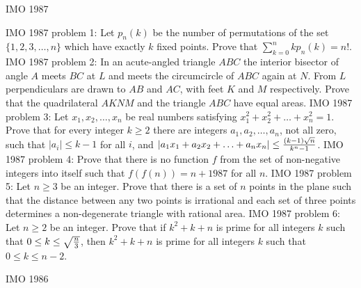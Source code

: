 IMO 1987 

IMO 1987 problem 1:  Let $p_n(k)$ be the number of permutations of the set $\{1,2,3,\ldots,n\}$ which have exactly $k$ fixed points. Prove that $\sum_{k=0}^nk p_n(k)=n!$. 
IMO 1987 problem 2:  In an acute-angled triangle $ABC$ the interior bisector of angle $A$ meets $BC$ at $L$ and meets the circumcircle of $ABC$ again at $N$. From $L$ perpendiculars are drawn to $AB$ and $AC$, with feet $K$ and $M$ respectively. Prove that the quadrilateral $AKNM$ and the triangle $ABC$ have equal areas. 
IMO 1987 problem 3:  Let $x_1,x_2,\ldots,x_n$ be real numbers satisfying $x_1^2+x_2^2+\ldots+x_n^2=1$. Prove that for every integer $k\ge2$ there are integers $a_1,a_2,\ldots,a_n$, not all zero, such that $|a_i|\le k-1$ for all $i$, and $|a_1x_1+a_2x_2+\ldots+a_nx_n|\le{(k-1)\sqrt n\over k^n-1}$. 
IMO 1987 problem 4:  Prove that there is no function $f$ from the set of non-negative integers into itself such that $f(f(n))=n+1987$ for all $n$. 
IMO 1987 problem 5:  Let $n\ge3$ be an integer. Prove that there is a set of $n$ points in the plane such that the distance between any two points is irrational and each set of three points determines a non-degenerate triangle with rational area. 
IMO 1987 problem 6:  Let $n\ge2$ be an integer. Prove that if $k^2+k+n$ is prime for all integers $k$ such that $0\le k\le\sqrt{n\over3}$, then $k^2+k+n$ is prime for all integers $k$ such that $0\le k\le n-2$. 

IMO 1986 

